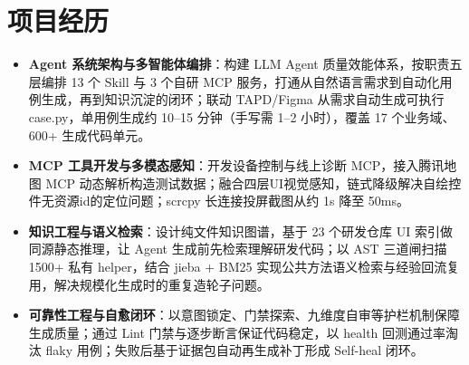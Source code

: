 \documentclass[10pt]{article}
\begin{document}


    \section[项目经历]{\makebox[\iconwidth][c]{\color{primarycolor}{\faProjectDiagram}}\quad 项目经历}

    \begin{itemize}
        \item \textbf{Agent 系统架构与多智能体编排}：构建 LLM Agent 质量效能体系，按职责五层编排 13 个 Skill 与 3 个自研 MCP 服务，打通从自然语言需求到自动化用例生成，再到知识沉淀的闭环；联动 TAPD/Figma 从需求自动生成可执行 case.py，单用例生成约 10--15 分钟（手写需 1--2 小时），覆盖 17 个业务域、600+ 生成代码单元。
        \item \textbf{MCP 工具开发与多模态感知}：开发设备控制与线上诊断 MCP，接入腾讯地图 MCP 动态解析构造测试数据；融合四层UI视觉感知，链式降级解决自绘控件无资源id的定位问题；scrcpy 长连接投屏截图从约 1s 降至 50ms。
        \item \textbf{知识工程与语义检索}：设计纯文件知识图谱，基于 23 个研发仓库 UI 索引做同源静态推理，让 Agent 生成前先检索理解研发代码；以 AST 三道闸扫描 1500+ 私有 helper，结合 jieba + BM25 实现公共方法语义检索与经验回流复用，解决规模化生成时的重复造轮子问题。
        \item \textbf{可靠性工程与自愈闭环}：以意图锁定、门禁探索、九维度自审等护栏机制保障生成质量；通过 Lint 门禁与逐步断言保证代码稳定，以 health 回测通过率淘汰 flaky 用例；失败后基于证据包自动再生成补丁形成 Self-heal 闭环。
    \end{itemize}
\end{document}
